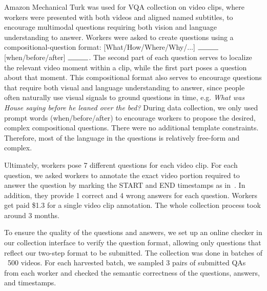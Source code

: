 \documentclass[11pt,a4paper]{article}
\begin{document}
Amazon Mechanical Turk was used for VQA collection on video clips, where workers were presented with both videos and aligned named subtitles, to encourage multimodal questions requiring both vision and language understanding to answer.
Workers were asked to create questions using a compositional-question format: [What/How/Where/Why/...] $\rule{1cm}{0.15mm}$ [when/before/after] $\rule{1cm}{0.15mm}$.
The second part of each question serves to localize the relevant video moment within a clip, while the first part poses a question about that moment. This compositional format also serves to encourage questions that require both visual and language understanding to answer, since people often naturally use visual signals to ground questions in time, e.g. \textit{What was House saying before he leaned over the bed?} During data collection, we only used prompt words (when/before/after) to encourage workers to propose the desired, complex compositional questions. There were no additional template constraints. Therefore, most of the language in the questions is relatively free-form and complex.

Ultimately, workers pose 7 different questions for each video clip.
For each question, we asked workers to annotate the exact video portion required to answer the question by marking the START and END timestamps as in~\citet{Krishna2017DenseCaptioningEI}. In addition, they provide 1 correct and 4 wrong answers for each question.
Workers get paid \$1.3 for a single video clip annotation. The whole collection process took around 3 months.

To ensure the quality of the questions and answers, we set up an online checker in our collection interface to verify the question format, allowing only questions that reflect our two-step format to be submitted. The collection was done in batches of ~500 videos. For each harvested batch, we sampled 3 pairs of submitted QAs from each worker and checked the semantic correctness of the questions, answers, and timestamps. 

\begin{table}[t]
\centering
{}
\caption{Statistics for different question types based on first question word. Q = question, CA = correct answer, WA = wrong answer. Length is defined as the number of words in the sentence.}
\label{tab:qtype_stat}
\end{table}
 
\end{document}
